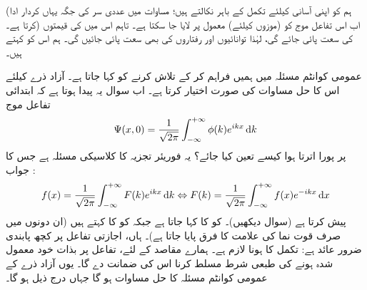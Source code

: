 (ہم  کو اپنی آسانی کیلئے تکمل کے باہر نکالتے ہیں؛ مساوات 
  میں عددی سر  کی جگہ یہاں  کردار ادا کرتا ہے۔) اب اس تفاعل موج کو (موزوں  کیلئے) معمول پر لایا جا سکتا ہے۔ تاہم اس میں  کی قیمتوں کی سعت پائی جائے گی، لہٰذا توانائیوں اور رفتاروں کی بھی سعت پائی جائیں گی۔ ہم اس کو  کہتے ہیں۔

عمومی کوانٹم مسئلہ میں ہمیں  فراہم کر کے  تلاش کرنے کو کہا جاتا ہے۔ آزاد ذرے کیلئے اس کا حل مساوات  کی صورت اختیار کرتا ہے۔ اب سوال یہ پیدا ہوتا ہے کہ ابتدائی تفاعل موج 
\begin{align}
\Psi (x,0) = \frac{1}{\sqrt{2\pi}} \int_{- \infty}^{+ \infty} \phi (k) e^{ikx} \dif k
\end{align}
پر پورا اترتا ہوا  کیسے تعین کیا جائے؟ یہ فوریئر تجزیہ کا کلاسیکی مسئلہ ہے جس کا جواب : 
\begin{align}\label{مساوات_شروڈنگر_مسئلہ_پلانشرل}
f(x) = \frac{1}{\sqrt{2\pi}} \int_{- \infty}^{+ \infty} F(k) e^{ikx} \dif k \Leftrightarrow F(k) = \frac{1}{\sqrt{2\pi}} \int_{- \infty}^{+ \infty} f(x) e^{-ikx} \dif x
\end{align}
 پیش کرتا ہے (سوال  دیکھیں)۔  کو  کا  کہا جاتا ہے جبکہ  کو  کا  کہتے ہیں (ان دونوں میں صرف قوت نما کی علامت کا فرق پایا جاتا ہے)۔ ہاں، اجازتی تفاعل پر کچھ پابندی ضرور عائد ہے: تکمل کا  ہونا لازم ہے۔ ہمارے مقاصد کے لئے، تفاعل  پر بذات خود معمول شدہ ہونے کی طبعی شرط مسلط کرنا اس کی ضمانت دے گا۔ یوں آزاد ذرے کے عمومی کوانٹم مسئلہ کا حل مساوات  ہو گا جہاں  درج ذیل ہو گا۔ 
